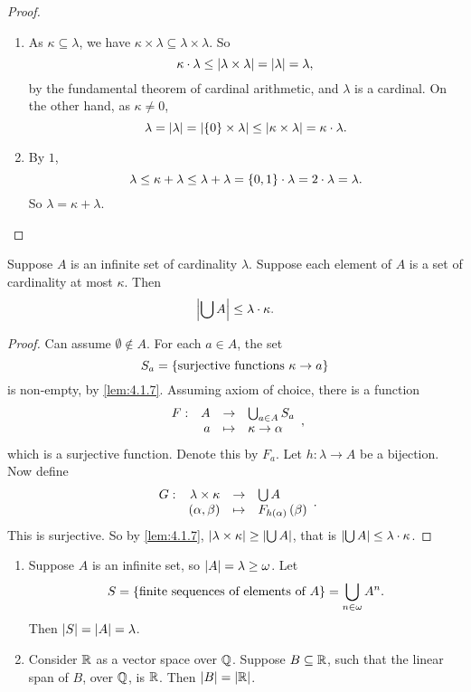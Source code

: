 \begin{proof}
\hfill
\begin{enumerate}
\item As $ \kappa \subseteq \lambda $, we have $ \kappa \times \lambda \subseteq \lambda \times \lambda $. So
$$ \kappa \cdot \lambda \le \left\lvert \lambda \times \lambda \right\rvert = \left\lvert \lambda \right\rvert = \lambda, $$
by the fundamental theorem of cardinal arithmetic, and $ \lambda $ is a cardinal. On the other hand, as $ \kappa \ne 0 $,
$$ \lambda = \left\lvert \lambda \right\rvert = \left\lvert \left\{ 0 \right\} \times \lambda \right\rvert \le \left\lvert \kappa \times \lambda \right\rvert = \kappa \cdot \lambda. $$
\item By $ 1 $,
$$ \lambda \le \kappa + \lambda \le \lambda + \lambda = \left\{ 0, 1 \right\} \cdot \lambda = 2 \cdot \lambda = \lambda. $$
So $ \lambda = \kappa + \lambda $.
\end{enumerate}
\end{proof}

\pagebreak

\begin{theorem}
\label{thm:4.2.6}
Suppose $ A $ is an infinite set of cardinality $ \lambda $. Suppose each element of $ A $ is a set of cardinality at most $ \kappa $. Then
$$ \left\lvert \bigcup A \right\rvert \le \lambda \cdot \kappa. $$
\end{theorem}

\begin{proof}
Can assume $ \emptyset \notin A $. For each $ a \in A $, the set
$$ S_a = \left\{ \text{surjective functions} \ \kappa \to a \right\} $$
is non-empty, by \ref{lem:4.1.7}. Assuming axiom of choice, there is a function
$$ \function[F]{A}{\bigcup_{a \in A} S_a}{a}{\kappa \to \alpha}, $$
which is a surjective function. Denote this by $ F_a $. Let $ h : \lambda \to A $ be a bijection. Now define
$$ \function[G]{\lambda \times \kappa}{\bigcup A}{\rb{\alpha, \beta}}{F_{h\rb{\alpha}}\rb{\beta}}. $$
This is surjective. So by \ref{lem:4.1.7}, $ \left\lvert \lambda \times \kappa \right\rvert \ge \left\lvert \bigcup A \right\rvert $, that is $ \left\lvert \bigcup A \right\rvert \le \lambda \cdot \kappa $.
\end{proof}

\begin{example}
\hfill
\begin{enumerate}
\item Suppose $ A $ is an infinite set, so $ \left\lvert A \right\rvert = \lambda \ge \omega $. Let
$$ S = \left\{ \text{finite sequences of elements of} \ A \right\} = \bigcup_{n \in \omega} A^n. $$
Then $ \left\lvert S \right\rvert = \left\lvert A \right\rvert = \lambda $.
\item Consider $ \mathbb{R} $ as a vector space over $ \mathbb{Q} $. Suppose $ B \subseteq \mathbb{R} $, such that the linear span of $ B $, over $ \mathbb{Q} $, is $ \mathbb{R} $. Then $ \left\lvert B \right\rvert = \left\lvert \mathbb{R} \right\rvert $.
\end{enumerate}
\end{example}

